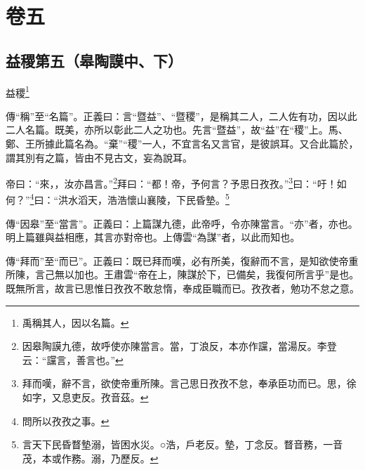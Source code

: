 

\chapter{卷五}


\section{益稷第五（皋陶謨中、下）}


益稷\footnote{禹稱其人，因以名篇。}

{\noindent\zhuan{}\fzbyks 傳“稱”至“名篇”。正義曰：言“暨益”、“暨稷”，是稱其二人，二人佐有功，因以此二人名篇。既美，亦所以彰此二人之功也。先言“暨益”，故“益”在“稷”上。馬、鄭、王所據此篇名為。“棄”“稷”一人，不宜言名又言官，是彼誤耳。又合此篇於，謂其別有之篇，皆由不見古文，妄為說耳。 \par}

帝曰：“來，，汝亦昌言。”\footnote{因皋陶謨九德，故呼使亦陳當言。當，丁浪反，本亦作讜，當湯反。李登云：“讜言，善言也。”}拜曰：“都！帝，予何言？予思日孜孜。”\footnote{拜而嘆，辭不言，欲使帝重所陳。言己思日孜孜不怠，奉承臣功而已。思，徐如字，又息吏反。孜音茲。}曰：“吁！如何？”\footnote{問所以孜孜之事。}曰：“洪水滔天，浩浩懷山襄陵，下民昏墊。\footnote{言天下民昏瞀墊溺，皆困水災。○浩，戶老反。墊，丁念反。瞀音務，一音茂，本或作務。溺，乃歷反。}


{\noindent\zhuan{}\fzbyks 傳“因皋”至“當言”。正義曰：上篇謀九德，此帝呼，令亦陳當言。“亦”者，亦也。明上篇雖與益相應，其言亦對帝也。上傳雲“為謀”者，以此而知也。 \par}

{\noindent\zhuan{}\fzbyks 傳“拜而”至“而已”。正義曰：既已拜而嘆，必有所美，復辭而不言，是知欲使帝重所陳，言己無以加也。王肅雲“帝在上，陳謀於下，已備矣，我復何所言乎”是也。既無所言，故言已思惟日孜孜不敢怠惰，奉成臣職而已。孜孜者，勉功不怠之意。 \par}


